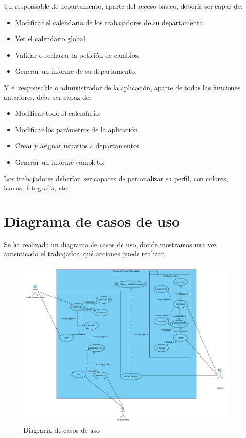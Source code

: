 \documentclass[11pt,spanish,listoffigures,listoftables]{tfgetsinf}
\begin{document}
Un responsable de departamento, aparte del acceso básico, debería ser capaz de:

\begin{itemize}
   \item Modificar el calendario de los trabajadores de su departamento.
   \item Ver el calendario global.
   \item Validar o rechazar la petición de cambios.
   \item Generar un informe de su departamento.
\end{itemize}

Y el responsable o administrador de la aplicación, aparte de todas las funciones anteriores, debe ser capaz de:

\begin{itemize}
   \item Modificar todo el calendario.
   \item Modificar los parámetros de la aplicación.
   \item Crear y asignar usuarios a departamentos.
   \item Generar un informe completo.
\end{itemize}

Los trabajadores deberían ser capaces de personalizar su perfil, con colores, iconos, fotografía, etc.

\section{Diagrama de casos de uso}

Se ha realizado un diagrama de casos de uso, donde mostramos una vez autenticado el trabajador, qué acciones puede realizar.

\begin{figure}[h!] %
   \includegraphics[width=\linewidth]{img/Casos de uso.png}
   \caption{Diagrama de casos de uso}
   \label{fig:CasosUso1}
 \end{figure}
\end{document}
